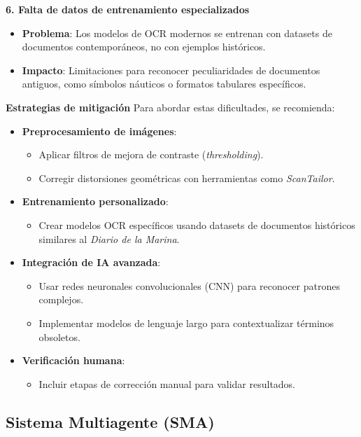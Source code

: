 \textbf{6. Falta de datos de entrenamiento especializados}
\begin{itemize}
	\item \textbf{Problema}:  
	Los modelos de OCR modernos se entrenan con datasets de documentos contemporáneos, no con ejemplos históricos.  
	
	\item \textbf{Impacto}:  
	Limitaciones para reconocer peculiaridades de documentos antiguos, como símbolos náuticos o formatos tabulares específicos.
\end{itemize}



\textbf{Estrategias de mitigación}
Para abordar estas dificultades, se recomienda:  
\begin{itemize}
	\item \textbf{Preprocesamiento de imágenes}:  
	\begin{itemize}
		\item Aplicar filtros de mejora de contraste (\textit{thresholding}).  
		\item Corregir distorsiones geométricas con herramientas como \textit{ScanTailor}.  
	\end{itemize}
	\item \textbf{Entrenamiento personalizado}:  
	\begin{itemize}
		\item Crear modelos OCR específicos usando datasets de documentos históricos similares al \textit{Diario de la Marina}.  
	\end{itemize}
	\item \textbf{Integración de IA avanzada}:  
	\begin{itemize}
		\item Usar redes neuronales convolucionales (CNN) para reconocer patrones complejos.  
		\item Implementar modelos de lenguaje largo para contextualizar términos obsoletos.  
	\end{itemize}
	\item \textbf{Verificación humana}:  
	\begin{itemize}
		\item Incluir etapas de corrección manual para validar resultados.  
	\end{itemize}
\end{itemize}

\subsection{Sistema Multiagente (SMA)}\label{seq_2}


